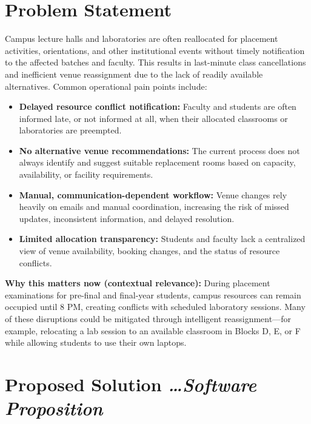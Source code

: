 \documentclass[11pt,a4paper]{article}
\newcommand{\BvrHint}[1]{%
  {\normalfont\normalsize\itshape\hfill #1}}
\begin{document}
\section{Problem Statement}
Campus lecture halls and laboratories are often reallocated for placement activities, orientations, and other institutional events without timely notification to the affected batches and faculty. This results in last-minute class cancellations and inefficient venue reassignment due to the lack of readily available alternatives. Common operational pain points include:
\begin{itemize}[leftmargin=0.7cm]
    \item \textbf{Delayed resource conflict notification:} Faculty and students are often informed late, or not informed at all, when their allocated classrooms or laboratories are preempted.
    \item \textbf{No alternative venue recommendations:} The current process does not always identify and suggest suitable replacement rooms based on capacity, availability, or facility requirements.
    \item \textbf{Manual, communication-dependent workflow:} Venue changes rely heavily on emails and manual coordination, increasing the risk of missed updates, inconsistent information, and delayed resolution.
    \item \textbf{Limited allocation transparency:} Students and faculty lack a centralized view of venue availability, booking changes, and the status of resource conflicts.
\end{itemize}

\textbf{Why this matters now (contextual relevance):} During placement examinations for pre-final and final-year students, campus resources can remain occupied until 8 PM, creating conflicts with scheduled laboratory sessions. Many of these disruptions could be mitigated through intelligent reassignment—for example, relocating a lab session to an available classroom in Blocks D, E, or F while allowing students to use their own laptops.

\section{Proposed Solution %
\BvrHint{\ldots Software Proposition}}
\end{document}
